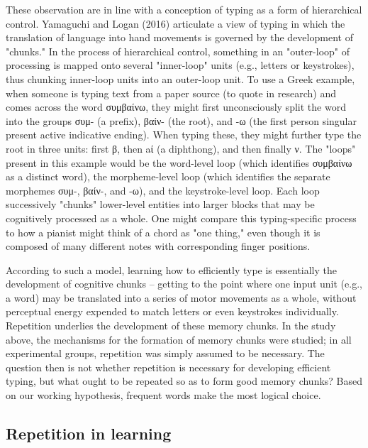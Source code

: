 \documentclass[11pt]{article}
\begin{document}
These observation are in line with a conception of typing as a form of hierarchical control. Yamaguchi and Logan (2016) articulate a view of typing in which the translation of language into hand movements is governed by the development of "chunks." In the process of hierarchical control, something in an "outer-loop" of processing is mapped onto several "inner-loop" units (e.g., letters or keystrokes), thus chunking inner-loop units into an outer-loop unit. To use a Greek example, when someone is typing text from a paper source (to quote in research) and comes across the word συμβαίνω, they might first unconsciously split the word into the groups συμ- (a prefix), βαίν- (the root), and -ω (the first person singular present active indicative ending). When typing these, they might further type the root in three units: first β, then aί (a diphthong), and then finally ν. The "loops" present in this example would be the word-level loop (which identifies συμβαίνω as a distinct word), the morpheme-level loop (which identifies the separate morphemes συμ-, βαίν-, and -ω), and the keystroke-level loop. Each loop successively "chunks" lower-level entities into larger blocks that may be cognitively processed as a whole. One might compare this typing-specific process to how a pianist might think of a chord as "one thing," even though it is composed of many different notes with corresponding finger positions.

According to such a model, learning how to efficiently type is essentially the development of cognitive chunks -- getting to the point where one input unit (e.g., a word) may be translated into a series of motor movements as a whole, without perceptual energy expended to match letters or even keystrokes individually. Repetition underlies the development of these memory chunks. In the study above, the mechanisms for the formation of memory chunks were studied; in all experimental groups, repetition was simply assumed to be necessary. The question then is not whether repetition is necessary for developing efficient typing, but what ought to be repeated so as to form good memory chunks? Based on our working hypothesis, frequent words make the most logical choice.

\subsection{Repetition in learning}
\label{sec:org3e85b7e}
\end{document}
